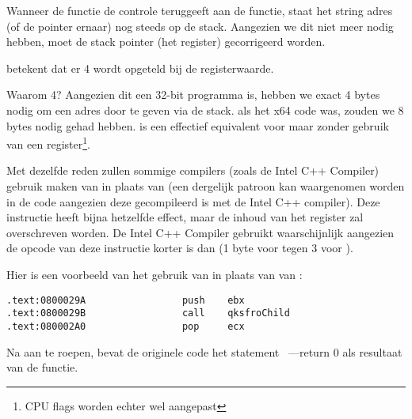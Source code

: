 Wanneer de \printf functie de controle teruggeeft aan de \main functie, staat het string adres (of de pointer ernaar) nog steeds op de stack.
Aangezien we dit niet meer nodig hebben, moet de \gls{stack pointer} (het \ESP register) gecorrigeerd worden.

 betekent dat er 4 wordt opgeteld bij de \ESP registerwaarde.

Waarom 4? Aangezien dit een 32-bit programma is, hebben we exact 4 bytes nodig om een adres door te geven via de stack. als het x64 code was, zouden we 8 bytes nodig gehad hebben.
 is een effectief equivalent voor  maar zonder gebruik van een register\footnote{CPU flags worden echter wel aangepast}.

\myindex{\oracle}

Met dezelfde reden zullen sommige compilers (zoals de Intel C++ Compiler) gebruik maken van 
in plaats van \ADD (een dergelijk patroon kan waargenomen worden in de \oracle{} code aangezien deze gecompileerd is met de Intel C++ compiler).
Deze instructie heeft bijna hetzelfde effect, maar de inhoud van het \ECX register zal overschreven worden.
De Intel C++ Compiler gebruikt waarschijnlijk  aangezien de opcode van deze instructie korter is dan  (1 byte voor  tegen 3 voor ).

Hier is een voorbeeld van het gebruik van \POP in plaats van \ADD van \oracle{}:

\begin{lstlisting}[caption=\oracle 10.2 Linux (app.o bestand),style=customasmx86]
.text:0800029A                 push    ebx
.text:0800029B                 call    qksfroChild
.text:080002A0                 pop     ecx
\end{lstlisting}



Na \printf aan te roepen, bevat de originele \CCpp code het statement ~---return 0 als resultaat van de \main functie.

